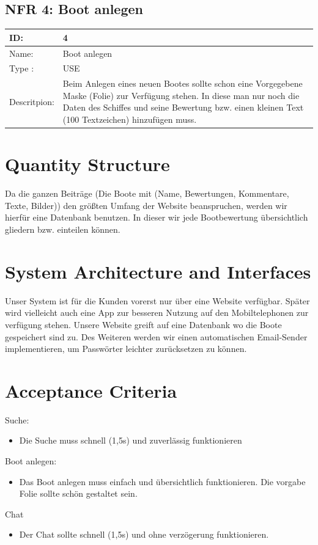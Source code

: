 \documentclass[12pt]{article}
\theoremstyle{definition}
\begin{document}
\subsection{NFR 4: Boot anlegen}
\begin{tabular}{|p{.2\linewidth}|p{.65\linewidth}|}
\hline 
ID: & 4 \\ \hline
Name: & Boot anlegen \\ \hline
Type	: & USE \\ \hline
Descritpion: &  Beim Anlegen eines neuen Bootes sollte schon eine Vorgegebene Maske (Folie) zur Verfügung stehen. In diese man nur noch die Daten des Schiffes und seine Bewertung bzw. einen kleinen Text (100 Textzeichen) hinzufügen muss.\\ \hline
\end{tabular}
\pagebreak

\section{Quantity Structure}
Da die ganzen Beiträge (Die Boote mit (Name, Bewertungen, Kommentare, Texte, Bilder)) den größten Umfang der Website beanspruchen, werden wir hierfür eine Datenbank benutzen. In dieser wir jede Bootbewertung übersichtlich gliedern bzw. einteilen können.

\pagebreak
\section{System Architecture and Interfaces}
Unser System ist für die Kunden vorerst nur über eine Website verfügbar. Später wird vielleicht auch eine App zur besseren Nutzung auf den Mobiltelephonen zur verfügung stehen. Unsere Website greift auf eine Datenbank wo die Boote gespeichert sind zu. Des Weiteren werden wir einen automatischen Email-Sender implementieren, um Passwörter leichter zurücksetzen zu können.

\pagebreak
\section{Acceptance Criteria}
Suche:
\begin{itemize}
	\item Die Suche muss schnell (1,5s) und zuverlässig funktionieren
\end{itemize}
Boot anlegen:
\begin{itemize}
	\item Das Boot anlegen muss einfach und übersichtlich funktionieren. Die vorgabe Folie sollte schön gestaltet sein.
\end{itemize}
Chat
\begin{itemize}
	\item Der Chat sollte schnell (1,5s) und ohne verzögerung funktionieren.
\end{itemize}
\end{document}
